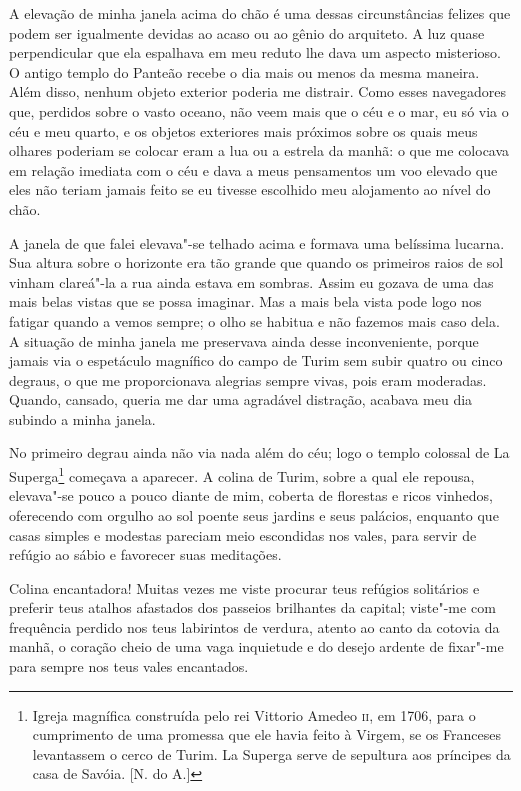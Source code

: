  A elevação de minha janela acima do chão é uma dessas circunstâncias
felizes que podem ser igualmente devidas ao acaso ou ao gênio do
arquiteto. A luz quase perpendicular que ela espalhava em meu reduto
lhe dava um aspecto misterioso. O antigo templo do Panteão recebe o dia
mais ou menos da mesma maneira. Além disso, nenhum objeto exterior
poderia me distrair. Como esses navegadores que, perdidos sobre o vasto
oceano, não veem mais que o céu e o mar, eu só via o céu e meu quarto,
e os objetos exteriores mais próximos sobre os quais meus olhares
poderiam se colocar eram a lua ou a estrela da manhã: o que me colocava
em relação imediata com o céu e dava a meus pensamentos um voo elevado
que eles não teriam jamais feito se eu tivesse escolhido meu alojamento
ao nível do chão.

 A janela de que falei elevava"-se telhado acima e formava uma belíssima
lucarna. Sua altura sobre o horizonte era tão grande que quando os
primeiros raios de sol vinham clareá"-la a rua ainda estava em sombras.
Assim eu gozava de uma das mais belas vistas que se possa imaginar. Mas
a mais bela vista pode logo nos fatigar quando a vemos sempre; o olho
se habitua e não fazemos mais caso dela. A situação de minha janela me
preservava ainda desse inconveniente, porque jamais via o espetáculo
magnífico do campo de Turim sem subir quatro ou cinco degraus, o que me
proporcionava alegrias sempre vivas, pois eram moderadas. Quando,
cansado, queria me dar uma agradável distração, acabava meu dia subindo
a minha janela.

 No primeiro degrau ainda não via nada além do céu; logo o templo
colossal de La Superga\footnote{ Igreja magnífica construída pelo rei
Vittorio Amedeo \textsc{ii}, em 1706, para o cumprimento de uma promessa que ele
havia feito à Virgem, se os Franceses levantassem o cerco de Turim. La
Superga serve de sepultura aos príncipes da casa de Savóia. [N. do A.]}
começava a aparecer. A colina de Turim, sobre a qual ele repousa,
elevava"-se pouco a pouco diante de mim, coberta de florestas e ricos
vinhedos, oferecendo com orgulho ao sol poente seus jardins e seus
palácios, enquanto que casas simples e modestas pareciam meio
escondidas nos vales, para servir de refúgio ao sábio e favorecer suas
meditações.

 Colina encantadora! Muitas vezes me viste procurar teus refúgios
solitários e preferir teus atalhos afastados dos passeios brilhantes da
capital; viste"-me com frequência perdido nos teus labirintos de
verdura, atento ao canto da cotovia da manhã, o coração cheio de uma
vaga inquietude e do desejo ardente de fixar"-me para sempre nos teus
vales encantados. 

